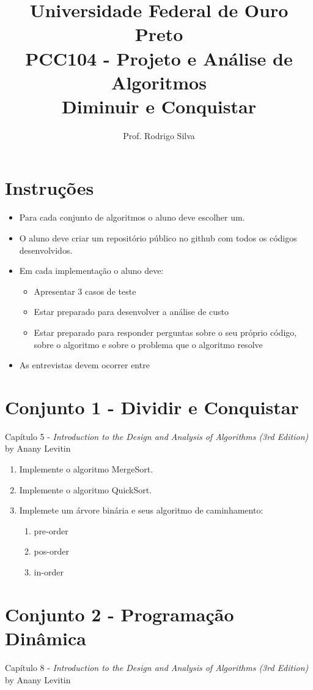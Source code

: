 \documentclass{article}
\title{\vspace{-2 cm}Universidade Federal de Ouro Preto \\ PCC104 - Projeto e Análise de Algoritmos \\ Diminuir e Conquistar}
\author{Prof. Rodrigo Silva}
\begin{document}
\maketitle

\section*{Instruções}

\begin{itemize}
    \item Para cada conjunto de algoritmos o aluno deve escolher um.
    \item O aluno deve criar um repositório público no github com todos os códigos desenvolvidos.
    \item Em cada implementação o aluno deve:
    \begin{itemize}
        \item Apresentar 3 casos de teste
        \item Estar preparado para desenvolver a análise de custo 
        \item Estar preparado para responder perguntas sobre o seu próprio código, sobre o algoritmo e sobre o problema que o algoritmo resolve 
    \end{itemize} 
    \item As entrevistas devem ocorrer entre 
\end{itemize}

\section{Conjunto 1 - Dividir e Conquistar}
Capítulo 5 - \textit{Introduction to the Design and Analysis of Algorithms (3rd Edition)} by Anany Levitin

\begin{enumerate}
    \item Implemente o algoritmo MergeSort.
    \item Implemente o algoritmo QuickSort.
    \item Implemete um árvore binária e seus algoritmo de caminhamento:
    \begin{enumerate}
        \item pre-order
        \item pos-order
        \item in-order 
    \end{enumerate}
\end{enumerate}

\section{Conjunto 2 - Programação Dinâmica}
Capítulo 8 - \textit{Introduction to the Design and Analysis of Algorithms (3rd Edition)} by Anany Levitin
\end{document}
